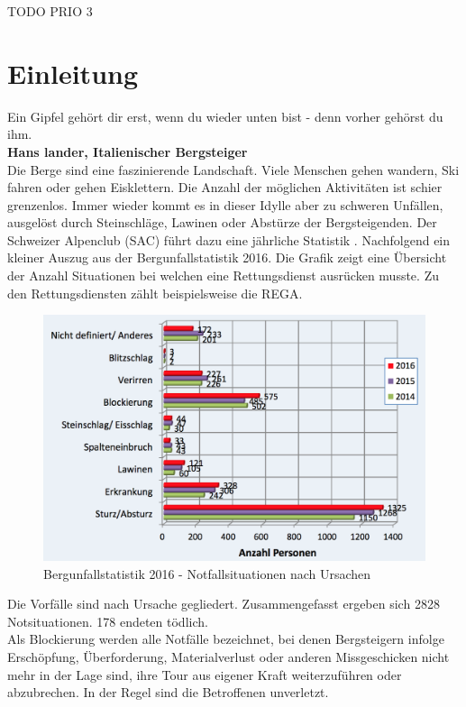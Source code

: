 \documentclass[11pt,english,german]{report}
\theoremstyle{definition}
\begin{document}
TODO
PRIO 3


\chapter{Einleitung}
Ein Gipfel gehört dir erst, wenn du wieder unten bist - denn vorher gehörst du ihm.\\[0.3cm]
\textbf{Hans lander, Italienischer Bergsteiger\cite{kammerlander}} \\[0.5cm]
\noindent
Die Berge sind eine faszinierende Landschaft. Viele Menschen gehen wandern, Ski fahren oder gehen Eisklettern. Die Anzahl der möglichen Aktivitäten ist schier grenzenlos. Immer wieder kommt es in dieser Idylle aber zu schweren Unfällen, ausgelöst durch Steinschläge, Lawinen oder Abstürze der Bergsteigenden. Der Schweizer Alpenclub (SAC) führt dazu eine jährliche Statistik \cite{sacaccident}. Nachfolgend ein kleiner Auszug aus der Bergunfallstatistik 2016. Die Grafik zeigt eine Übersicht der Anzahl Situationen bei welchen eine Rettungsdienst ausrücken musste. Zu den Rettungsdiensten zählt beispielsweise die REGA.\\
\begin{figure}[H]
	\centering
	\includegraphics[width=\textwidth]{img/sac_accidentstatistic_2016_reason.png}
	\caption[Bergunfallstatistik 2016 - Notfallsituationen nach Unrsachen]
	{Bergunfallstatistik 2016 - Notfallsituationen nach Ursachen}
\end{figure}
\noindent
Die Vorfälle sind nach Ursache gegliedert. Zusammengefasst ergeben sich 2828 Notsituationen. 178 endeten tödlich.\\[0.3cm]
Als Blockierung werden alle Notfälle bezeichnet, bei denen Bergsteigern infolge Erschöpfung, Überforderung, Materialverlust oder anderen Missgeschicken nicht mehr in der Lage sind, ihre Tour aus eigener Kraft weiterzuführen oder abzubrechen. In der Regel sind die Betroffenen unverletzt.
\end{document}
